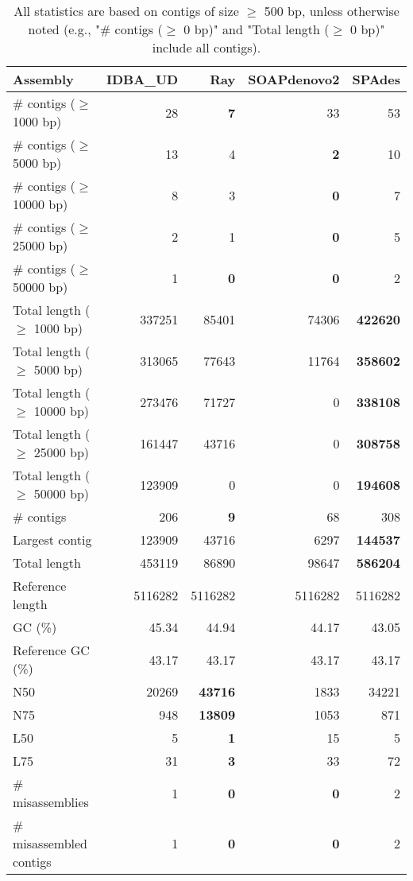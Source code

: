 \documentclass[12pt,a4paper]{article}
\begin{document}
\begin{table}[ht]
\begin{center}
\caption{All statistics are based on contigs of size $\geq$ 500 bp, unless otherwise noted (e.g., "\# contigs ($\geq$ 0 bp)" and "Total length ($\geq$ 0 bp)" include all contigs).}
\begin{tabular}{|l*{4}{|r}|}
\hline
Assembly & IDBA\_UD & Ray & SOAPdenovo2 & SPAdes \\ \hline
\# contigs ($\geq$ 1000 bp) & 28 & {\bf 7} & 33 & 53 \\ \hline
\# contigs ($\geq$ 5000 bp) & 13 & 4 & {\bf 2} & 10 \\ \hline
\# contigs ($\geq$ 10000 bp) & 8 & 3 & {\bf 0} & 7 \\ \hline
\# contigs ($\geq$ 25000 bp) & 2 & 1 & {\bf 0} & 5 \\ \hline
\# contigs ($\geq$ 50000 bp) & 1 & {\bf 0} & {\bf 0} & 2 \\ \hline
Total length ($\geq$ 1000 bp) & 337251 & 85401 & 74306 & {\bf 422620} \\ \hline
Total length ($\geq$ 5000 bp) & 313065 & 77643 & 11764 & {\bf 358602} \\ \hline
Total length ($\geq$ 10000 bp) & 273476 & 71727 & 0 & {\bf 338108} \\ \hline
Total length ($\geq$ 25000 bp) & 161447 & 43716 & 0 & {\bf 308758} \\ \hline
Total length ($\geq$ 50000 bp) & 123909 & 0 & 0 & {\bf 194608} \\ \hline
\# contigs & 206 & {\bf 9} & 68 & 308 \\ \hline
Largest contig & 123909 & 43716 & 6297 & {\bf 144537} \\ \hline
Total length & 453119 & 86890 & 98647 & {\bf 586204} \\ \hline
Reference length & 5116282 & 5116282 & 5116282 & 5116282 \\ \hline
GC (\%) & 45.34 & 44.94 & 44.17 & 43.05 \\ \hline
Reference GC (\%) & 43.17 & 43.17 & 43.17 & 43.17 \\ \hline
N50 & 20269 & {\bf 43716} & 1833 & 34221 \\ \hline
N75 & 948 & {\bf 13809} & 1053 & 871 \\ \hline
L50 & 5 & {\bf 1} & 15 & 5 \\ \hline
L75 & 31 & {\bf 3} & 33 & 72 \\ \hline
\# misassemblies & 1 & {\bf 0} & {\bf 0} & 2 \\ \hline
\# misassembled contigs & 1 & {\bf 0} & {\bf 0} & 2 \\ \hline

\end{tabular}
\end{center}
\end{table}
\end{document}
